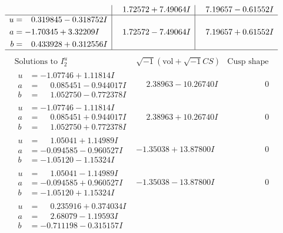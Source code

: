 \documentclass[1p]{elsarticle_modified}
\theoremstyle{definition}
\newcommand{\I}{\sqrt{-1}}
\begin{document}
$$\begin{array}{c|c|c}
 & \phantom{-}1.72572 + 7.49064 I & \phantom{-}7.19657 - 0.61552 I \\ \hline\begin{aligned}
u &= \phantom{-}0.319845 - 0.318752 I \\
a &= -1.70345 + 3.32209 I \\
b &= \phantom{-}0.433928 + 0.312556 I\end{aligned}
 & \phantom{-}1.72572 - 7.49064 I & \phantom{-}7.19657 + 0.61552 I\\
 \hline 
 \end{array}$$\newpage$$\begin{array}{c|c|c}  
\text{Solutions to }I^u_{2}& \I (\text{vol} + \sqrt{-1}CS) & \text{Cusp shape}\\
 \hline 
\begin{aligned}
u &= -1.07746 + 1.11814 I \\
a &= \phantom{-}0.085451 - 0.944017 I \\
b &= \phantom{-}1.052750 - 0.772378 I\end{aligned}
 & \phantom{-}2.38963 - 10.26740 I & \phantom{-0.000000 } 0 \\ \hline\begin{aligned}
u &= -1.07746 - 1.11814 I \\
a &= \phantom{-}0.085451 + 0.944017 I \\
b &= \phantom{-}1.052750 + 0.772378 I\end{aligned}
 & \phantom{-}2.38963 + 10.26740 I & \phantom{-0.000000 } 0 \\ \hline\begin{aligned}
u &= \phantom{-}1.05041 + 1.14989 I \\
a &= -0.094585 - 0.960527 I \\
b &= -1.05120 - 1.15324 I\end{aligned}
 & -1.35038 + 13.87800 I & \phantom{-0.000000 } 0 \\ \hline\begin{aligned}
u &= \phantom{-}1.05041 - 1.14989 I \\
a &= -0.094585 + 0.960527 I \\
b &= -1.05120 + 1.15324 I\end{aligned}
 & -1.35038 - 13.87800 I & \phantom{-0.000000 } 0 \\ \hline\begin{aligned}
u &= \phantom{-}0.235916 + 0.374034 I \\
a &= \phantom{-}2.68079 - 1.19593 I \\
b &= -0.711198 - 0.315157 I\end{aligned}

\end{array}$$
\end{document}
